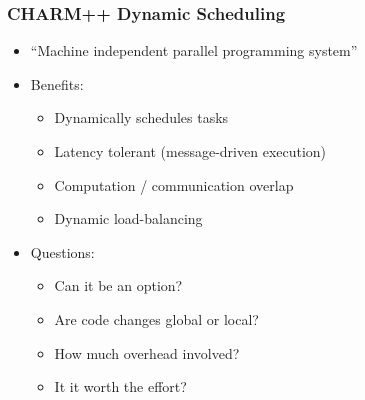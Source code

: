 \begin{frame}[fragile] \frametitle{CHARM++ Dynamic Scheduling}
\begin{itemize}
\item ``Machine independent parallel programming system''
\item Benefits:
\begin{itemize}
\item Dynamically schedules tasks
\item Latency tolerant (message-driven execution)
\item Computation / communication overlap
\item Dynamic load-balancing
\end{itemize} 
\item Questions:
\begin{itemize}
\item Can it be an option?
\item Are code changes global or local?
\item How much overhead involved?
\item It it worth the effort?
\end{itemize}
\end{itemize}
\end{frame}
